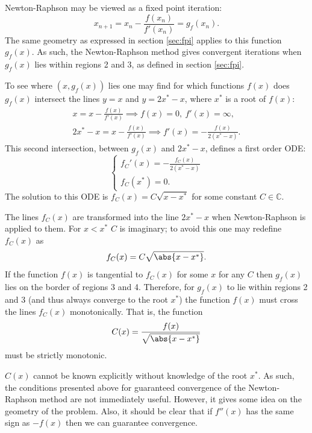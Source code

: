 \documentclass{article}
\begin{document}
Newton-Raphson may be viewed as a fixed point iteration:
\begin{equation*}
x_{n+1} = x_n - \frac{f(x_n)}{f'(x_n)} = g_f(x_n) .
\end{equation*}
The same geometry as expressed in section \ref{sec:fpi} applies to this function $g_f(x)$.
As such, the Newton-Raphson method gives convergent iterations when $g_f(x)$ lies within regions 2 and 3, as defined in section \ref{sec:fpi}.

To see where $(x, g_f(x))$ lies one may find for which functions $f(x)$ does $g_f(x)$ intersect the lines $y = x$ and $y = 2 x^* - x$, where $x^*$ is a root of $f(x)$:
\begin{align*}
x = x - \frac{f(x)}{f'(x)} \implies f(x) = 0, \ f'(x) = \infty, \\
2 x^* - x = x - \frac{f(x)}{f'(x)} \implies f'(x) = - \frac{f(x)}{2 (x^* - x)} .
\end{align*}
This second intersection, between $g_f(x)$ and $2 x^* - x$, defines a first order ODE:
\begin{equation}
\begin{cases} f_C'(x) = - \frac{f_C(x)}{2 (x^* - x)} \\ f_C(x^*) = 0 . \end{cases}
\end{equation}
The solution to this ODE is $f_C(x) = C \sqrt{x - x^*}$ for some constant $C \in \mathbb{C}$.

The lines $f_C(x)$ are transformed into the line $2 x^* - x$ when Newton-Raphson is applied to them.
For $x < x^*$ $C$ is imaginary; to avoid this one may redefine $f_C(x)$ as
\begin{equation}
f_C(x) = C \sqrt{\abs{x - x^*}} .
\end{equation}
If the function $f(x)$ is tangential to $f_C(x)$ for some $x$ for any $C$ then $g_f(x)$ lies on the border of regions 3 and 4.
Therefore, for $g_f(x)$ to lie within regions 2 and 3 (and thus always converge to the root $x^*$) the function $f(x)$ must cross the lines $f_C(x)$ monotonically.
That is, the function
\begin{equation*}
C(x) = \frac{f(x)}{\sqrt{\abs{x-x^*}}}
\end{equation*}
must be strictly monotonic.

$C(x)$ cannot be known explicitly without knowledge of the root $x^*$.
As such, the conditions presented above for guaranteed convergence of the Newton-Raphson method are not immediately useful.
However, it gives some idea on the geometry of the problem.
Also, it should be clear that if $f''(x)$ has the same sign as $-f(x)$ then we can guarantee convergence.
\end{document}
